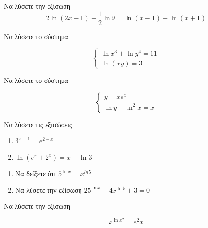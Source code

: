 \documentclass{../presentation}
\begin{document}
\begin{askisi}
  Να λύσετε την εξίσωση
  $$2\ln (2x-1)-\dfrac{1}{2}\ln 9=\ln (x-1)+\ln (x+1)$$


\end{askisi}

\begin{askisi}
  Να λύσετε το σύστημα

  $$\begin{cases}
      \ln x^3+\ln y^4=11 \\
      \ln (xy)=3
    \end{cases}$$


\end{askisi}

\begin{askisi}
  Να λύσετε το σύστημα

  $$\begin{cases}
      y=xe^x \\
      \ln y-\ln^2x=x
    \end{cases}$$


\end{askisi}

\begin{askisi}
  Να λύσετε τις εξισώσεις
  \begin{enumerate}
    \item<1-> $3^{x-1}=e^{2-x}$
    \item<2-> $\ln (e^x+2^x)=x+\ln 3$
  \end{enumerate}


\end{askisi}

\begin{askisi}
  \begin{enumerate}
    \item<1-> Να δείξετε ότι $5^{\ln x}=x^{ln 5}$
    \item<2-> Να λύσετε την εξίσωση $25^{\ln x}-4x^{\ln 5}+3=0$
  \end{enumerate}


\end{askisi}

\begin{askisi}
  Να λύσετε την εξίσωση

  $$x^{\ln x^2}=e^2x$$


\end{askisi}
\end{document}
